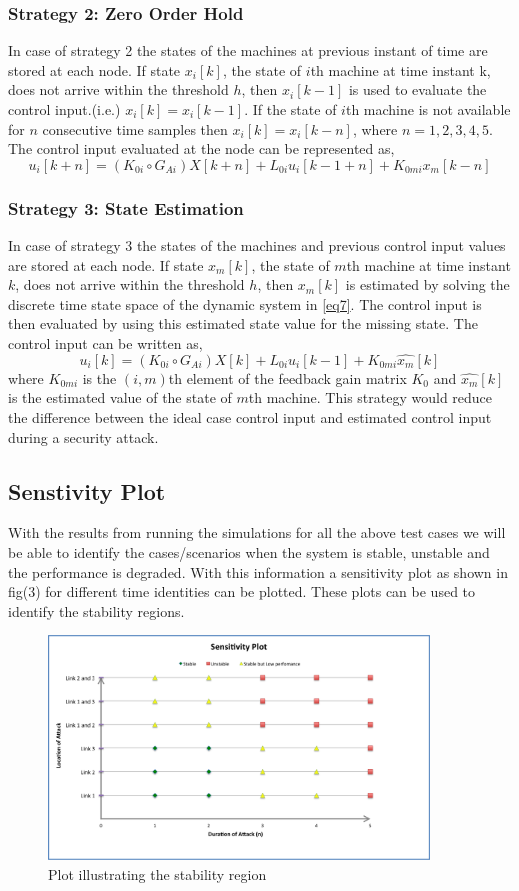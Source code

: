 \documentclass[a4paper]{article}
\begin{document}
\subsubsection{Strategy 2: Zero Order Hold}
In case of strategy 2 the states of the machines at previous instant of time are stored at each node. If state $x_{i}[k]$, the state of $i$th machine at time instant k, does not arrive within the threshold $h$, then $x_{i}[k-1]$ is used to evaluate the control input.(i.e.) $x_{i}[k] = x_{i}[k-1]$. If the state of $i$th machine is not available for $n$ consecutive time samples then $x_{i}[k] = x_{i}[k-n]$, where $n = 1,2,3,4,5$. The control input evaluated at the node can be represented as,
\begin{equation}
u_{i}[k+n] = (K_{0i}\circ G_{Ai}) X[k+n] + L_{0i}u_{i}[k-1+n] + K_{0mi}x_{m}[k-n]
\end{equation}

\subsubsection{Strategy 3: State Estimation}
In case of strategy 3 the states of the machines and previous control input values are stored at each node. If state $x_{m}[k]$, the state of $m$th machine at time instant $k$, does not arrive within the threshold $h$, then $x_{m}[k]$ is estimated by solving the discrete time state space of the dynamic system in \eqref{eq7}. The control input is then evaluated by using this estimated state value for the missing state. The control input can be written as,
\begin{equation}
u_{i}[k] = (K_{0i}\circ G_{Ai}) X[k] + L_{0i}u_{i}[k-1] + K_{0mi}\hat{x_{m}}[k]
\end{equation}
where $K_{0mi}$ is the $(i,m)$th element of the feedback gain matrix $K_{0}$ and $\hat{x_{m}}[k]$ is the estimated value of the state of $m$th machine. This strategy would reduce the difference between the ideal case control input and estimated control input during a security attack.
\subsection{Senstivity Plot}
With the results from running the simulations for all the above test cases we will be able to identify the cases/scenarios when the system is stable, unstable and the performance is degraded. With this information a sensitivity plot as shown in fig(3) for different time identities can be plotted. These plots can be used to identify the stability regions.

\begin{figure}
\centering
\includegraphics[width=0.9\textwidth]{sensitivity_plot2.png}
\caption{\label{fig:plot} Plot illustrating the stability region}
\end{figure}
\end{document}
